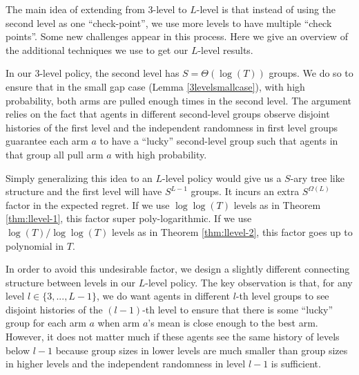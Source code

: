The main idea of extending from 3-level to $L$-level is that instead of using the second level as one ``check-point'', we use more levels to have multiple ``check points''.  Some new challenges appear in this process. Here we give an overview of the additional techniques we use to get our $L$-level results. 

 In our 3-level policy, the second level has $S = \Theta(\log(T))$ groups. We do so to ensure that in the small gap case (Lemma \ref{3levelsmallcase}), with high probability, both arms are pulled enough times in the second level. The argument relies on the fact that agents in different second-level groups observe disjoint histories of the first level and the independent randomness in first level groups guarantee each arm $a$ to have a ``lucky'' second-level group such that agents in that group all pull arm $a$ with high probability. 

Simply generalizing this idea to an $L$-level policy would give us a $S$-ary tree like structure and the first level will have $S^{L-1}$ groups. It incurs an extra $S^{\Omega(L)}$ factor in the expected regret. If we use $\log\log(T)$ levels as in Theorem \ref{thm:llevel-1}, this factor super poly-logarithmic. If we use $\log(T)/\log\log(T)$ levels as in Theorem \ref{thm:llevel-2}, this factor goes up to polynomial in $T$. 

In order to avoid this undesirable factor, we design a slightly different connecting structure between levels in our $L$-level policy. The key observation is that, for any level $l \in \{3,...,L-1\}$, we do want agents in different $l$-th level groups to see disjoint histories of the $(l-1)$-th level to ensure that there is some ``lucky'' group for each arm $a$ when arm $a$'s mean is close enough to the best arm. However, it does not matter much if these agents see the same history of levels below $l-1$ because group sizes in lower levels are much smaller than group sizes in higher levels and the independent randomness in level $l-1$ is sufficient.

